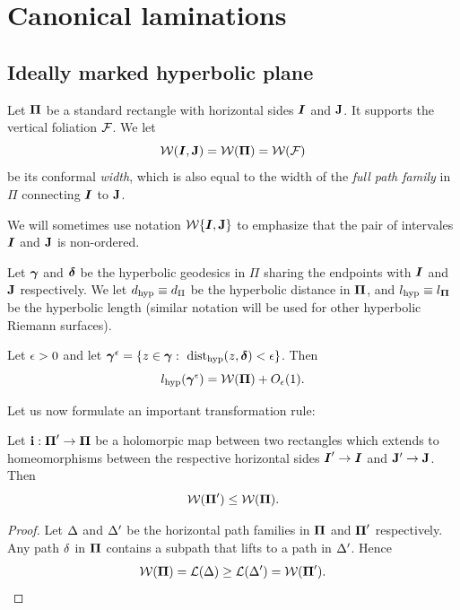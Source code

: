 \section{Canonical laminations}

\subsection{Ideally marked hyperbolic plane}
 

  Let ${\boldsymbol{\Pi}}$ be a  standard rectangle with horizontal sides ${\boldsymbol{I}}$ and
  ${\mathbf{J}}$. It supports  the vertical foliation ${\mathcal F}$. We let 
$$
   {\mathcal W}({\boldsymbol{I}}, {\mathbf{J}}) =  {\mathcal W}({\boldsymbol{\Pi}})  = {\mathcal W}({\mathcal F}) 
$$
be its conformal {\it width}, which is also equal to the width of the 
{\it full path family} in $\Pi$ connecting ${\boldsymbol{I}}$ to ${\mathbf{J}}$.  

\begin{rem}
  We will sometimes use notation ${\mathcal W}\{ {\boldsymbol{I}}, {\mathbf{J}}\}$ to emphasize that the
  pair of intervales ${\boldsymbol{I}}$ and ${\mathbf{J}}$ is non-ordered. 
\end{rem}

Let ${\boldsymbol{\gamma}}$ and ${\boldsymbol{\delta}}$ be the hyperbolic geodesics in $\Pi$ sharing
the endpoints with ${\boldsymbol{I}}$ and ${\mathbf{J}}$ respectively. We let $d_{\mathrm{hyp}}\equiv d_\Pi$ be the
hyperbolic distance in ${\boldsymbol{\Pi}}$, and $l_{\mathrm{hyp}}\equiv l_{\boldsymbol{\Pi}}$ be the
 hyperbolic length  (similar notation will be used for other
hyperbolic Riemann surfaces). 

\begin{lem}\label{geod in quadr}
    Let ${\epsilon}>0$ and let ${\boldsymbol{\gamma}}^{\epsilon}=\{ z\in{\boldsymbol{\gamma}}: \ \operatorname{dist}_{\mathrm{hyp}} (z, {\boldsymbol{\delta}})
    < {\epsilon}\} $. Then 
$$
       l_{\mathrm{hyp}} ({\boldsymbol{\gamma}}^{\epsilon}) = {\mathcal W}({\boldsymbol{\Pi}}) + O_{\epsilon} (1).
$$
\end{lem}

Let us now formulate an important transformation rule: 

\begin{lem}\label{tranform rule for rectangles}
   Let ${\mathbf{i}}: {\boldsymbol{\Pi}}'\rightarrow {\boldsymbol{\Pi}}$ be a holomorpic map between two rectangles
which extends to homeomorphisms between the respective  horizontal  sides
${\boldsymbol{I}}'\rightarrow {\boldsymbol{I}}$ and ${\mathbf{J}}'\rightarrow {\mathbf{J}}$. Then
$$
      {\mathcal W}(  {\boldsymbol{\Pi}}' ) \leq {\mathcal W} ( {\boldsymbol{\Pi}} ). 
$$ 
\end{lem}

\begin{proof}
Let ${\Delta}$ and ${\Delta}'$ be the horizontal path families in ${\boldsymbol{\Pi}}$
and ${\boldsymbol{\Pi}}'$ respectively.  
 Any  path  ${\delta}$ in ${\boldsymbol{\Pi}}$  contains a subpath that lifts to a 
  path in ${\Delta}'$.  Hence 
$$
     {\mathcal W}({\boldsymbol{\Pi}})= {\mathcal L}({\Delta}) \geq {\mathcal L}({\Delta}') = {\mathcal W}({\boldsymbol{\Pi}}').
$$
\end{proof}

